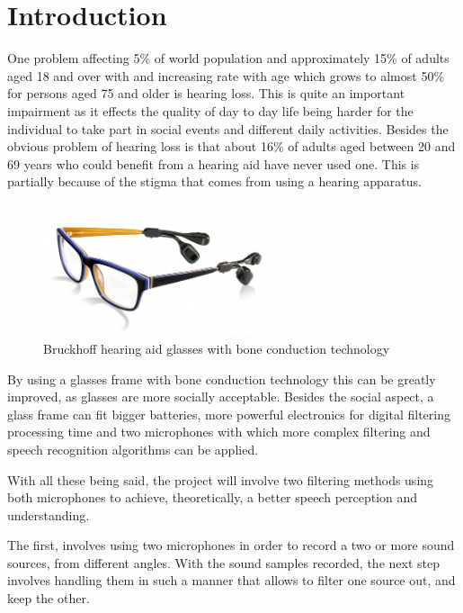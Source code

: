 \chapter{Introduction}\label{ch:introduction}
 
 One problem affecting 5\% of world population and approximately 15\% of adults aged 18 and over with and increasing rate with age which grows to almost 50\% for persons aged 75 and older is hearing loss.
 This is quite an important impairment as it effects the quality of day to day life being harder for the individual to take part in social events and different daily activities. Besides the obvious problem of hearing loss is that about 16\% of adults aged between 20 and 69 years who could benefit from a hearing aid have never used one. This is partially because of the stigma that comes from using a hearing apparatus.
 
 \begin{figure}[htp]
	\centering
	\includegraphics[width = 0.6\textwidth]{Illustrations/glasses_with_hearing_stuff.jpg}
	\caption{Bruckhoff hearing aid glasses with bone conduction technology}
	\label{fig:BoneConductionGlasses}
\end{figure}
 
By using a glasses frame with bone conduction technology this can be greatly improved, as glasses are more socially acceptable. Besides the social aspect, a glass frame can fit bigger batteries, more powerful electronics for digital filtering processing time and two microphones with which more complex filtering and speech recognition algorithms can be applied.

With all these being said, the project will involve two filtering methods using both microphones to achieve, theoretically, a better speech perception and understanding.

The first, involves using two microphones in order to record a two or 
more sound sources, from different angles.
With the sound samples recorded, the next step involves handling them 
in such a manner that allows to filter one source out, and keep the other.

